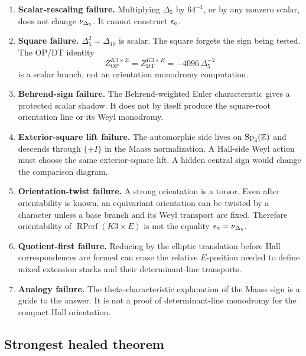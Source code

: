 \begin{enumerate}
\item \textbf{Scalar-rescaling failure.}
Multiplying \(\Delta_5\) by \(64^{-1}\), or by any nonzero scalar,
does not change \(\nu_{\Delta_5}\).  It cannot construct \(\epsilon_o\).

\item \textbf{Square failure.}
\(\Delta_5^2=\Delta_{10}\) is scalar.  The square forgets the sign
being tested.  The OP/DT identity
\[
        Z_{\mathrm{OP}}^{K3\times E}
        =
        Z_{\mathrm{DT}}^{K3\times E}
        =
        -4096\,\Delta_5^{-2}
\]
is a scalar branch, not an orientation monodromy computation.

\item \textbf{Behrend-sign failure.}
The Behrend-weighted Euler characteristic gives a protected scalar
shadow.  It does not by itself produce the square-root orientation line
or its Weyl monodromy.

\item \textbf{Exterior-square lift failure.}
The automorphic side lives on \(\operatorname{Sp}_4(\mathbb Z)\) and descends through
\(\{\pm I\}\) in the Maass normalization.  A Hall-side Weyl action must
choose the same exterior-square lift.  A hidden central sign would change
the comparison diagram.

\item \textbf{Orientation-twist failure.}
A strong orientation is a torsor.  Even after orientability is known,
an equivariant orientation can be twisted by a character unless a base
branch and its Weyl transport are fixed.  Therefore orientability of
\(\operatorname{RPerf}(K3\times E)\) is not the equality
\(\epsilon_o=\nu_{\Delta_5}\).

\item \textbf{Quotient-first failure.}
Reducing by the elliptic translation before Hall correspondences are
formed can erase the relative \(E\)-position needed to define mixed
extension stacks and their determinant-line transports.

\item \textbf{Analogy failure.}
The theta-characteristic explanation of the Maass sign is a guide to the
answer.  It is not a proof of determinant-line monodromy for the compact
Hall orientation.
\end{enumerate}

\subsection{Strongest healed theorem}

